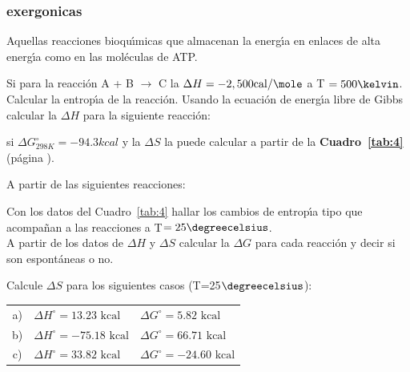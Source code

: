 \subsubsection{\gls{exergonicas}} Aquellas reacciones
bioqu\'{\i}micas que almacenan la energ\'{\i}a en enlaces de alta energ\'{\i}a como en las
mol\'eculas de ATP.

\newpage
\begin{exercises}

\exer Si para la reacci\'on A + B
$\longrightarrow$ C la
$\Delta H = -2,500 \mathrm{cal}/\mole$ a   T $= 500 \kelvin$. Calcular la entrop\'{\i}a de la reacci\'on.
\exer Usando la ecuaci\'on de energ\'{\i}a libre de
Gibbs calcular la
$\Delta H$ para la siguiente reacci\'on:


si $\Delta G^\circ_{298K} = -94.3 kcal$ y la $\Delta S$ la puede calcular a partir de la
\textbf{Cuadro~\ref{tab:4}} (p\'agina \pageref{tab:4}).

\exer A partir de las siguientes reacciones:
 \subexer  Con los datos del Cuadro~\ref{tab:4}  hallar los cambios de entrop\'{\i}a tipo que acompa\~nan a las reacciones
 a T$= 25\degreecelsius$.\\
\subexer A partir de los datos de $\Delta H$ y $\Delta S$
calcular la $\Delta G$ para cada reacci\'on y decir si son espont\'aneas o no.
 
\exer Calcule $\Delta S$ para los siguientes casos
(T=25$\degreecelsius$):\\
\begin{tabular}{cll}
a)&$\Delta H^\circ = 13.23 \textrm{ kcal}$ &$\Delta G^\circ=5.82\textrm{ kcal}$\\
 b)&$\Delta H^\circ = -75.18 \textrm{ kcal}$ &$\Delta G^\circ=66.71 \textrm{ kcal}$\\
c)&$\Delta H^\circ = 33.82 \textrm{ kcal}$&$\Delta G^\circ=-24.60 \textrm{ kcal}$\\
\end{tabular}
\end{exercises}


